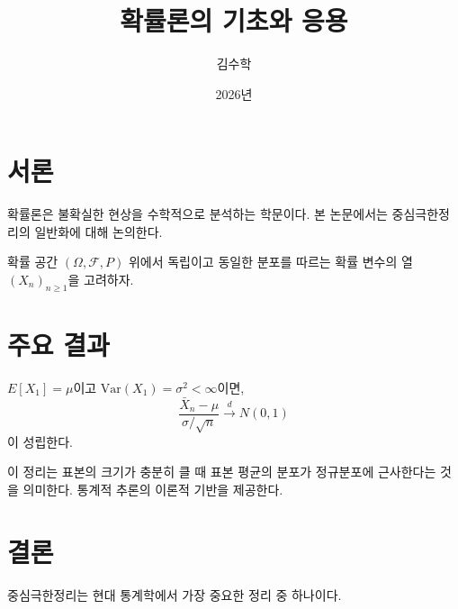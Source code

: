 \documentclass{article}
\title{확률론의 기초와 응용}
\author{김수학}
\date{2026년}
\begin{document}
\maketitle

\section{서론}

확률론은 불확실한 현상을 수학적으로 분석하는 학문이다.
본 논문에서는 중심극한정리의 일반화에 대해 논의한다.

확률 공간 $(\Omega, \mathcal{F}, P)$ 위에서 독립이고 동일한 분포를 따르는
확률 변수의 열 $(X_n)_{n \ge 1}$을 고려하자.

\section{주요 결과}

\begin{theorem}[중심극한정리]
$E[X_1] = \mu$이고 $\text{Var}(X_1) = \sigma^2 < \infty$이면,
\[
  \frac{\bar{X}_n - \mu}{\sigma / \sqrt{n}} \xrightarrow{d} N(0, 1)
\]
이 성립한다.
\end{theorem}

이 정리는 표본의 크기가 충분히 클 때 표본 평균의 분포가 정규분포에
근사한다는 것을 의미한다.  통계적 추론의 이론적 기반을 제공한다.

\section{결론}

중심극한정리는 현대 통계학에서 가장 중요한 정리 중 하나이다.
\end{document}
